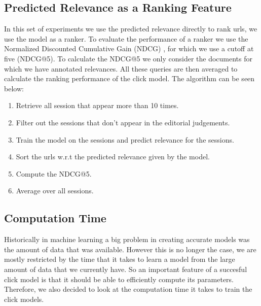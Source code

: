 \subsection{Predicted Relevance as a Ranking Feature}
In this set of experiments we use the predicted relevance directly to rank urls, we use the model as a ranker. To evaluate the performance of a ranker we use the Normalized Discounted Cumulative Gain (NDCG) \cite{NDCG}, for which we use a cutoff at five (NDCG@5). To calculate the NDCG@5 we only consider the documents for which we have annotated relevances. All these queries are then averaged to calculate the ranking performance of the click model. The algorithm can be seen below:

\begin{enumerate}
	\item Retrieve all session that appear more than 10 times.
	\item Filter out the sessions that don't appear in the editorial judgements.
	\item Train the model on the sessions and predict relevance for the sessions.
	\item Sort the urls w.r.t the predicted relevance given by the model.
	\item Compute the NDCG@5.
	\item Average over all sessions.
\end{enumerate}

\subsection{Computation Time}
Historically in machine learning a big problem in creating accurate models was the amount of data that was available. However this is no longer the case, we are mostly restricted by the time that it takes to learn a model from the large amount of data that we currently have. So an important feature of a succesful click model is that it should be able to efficiently compute its parameters. Therefore, we also decided to look at the computation time it takes to train the click models.

